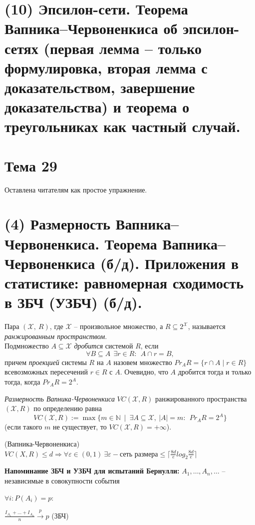 \newpage{}

\section{(10) Эпсилон-сети. Теорема Вапника–Червоненкиса об эпсилон-сетях (первая лемма – только формулировка, вторая лемма с доказательством, завершение доказательства) и теорема о треугольниках как частный случай.}

\newpage{}

\section{Тема 29}
Оставлена читателям как простое упражнение.
\newpage{}

\section{(4) Размерность Вапника–Червоненкиса. Теорема Вапника–Червоненкиса (б/д). Приложения в статистике: равномерная сходимость в ЗБЧ (УЗБЧ) (б/д).}

\Def Пара $(\mathcal{X},\: R)$, где $\mathcal{X}$ -- произвольное множество, а $R \subseteq 2^{\mathcal{X}}$,  называется {\it ранжированным пространством}. \\ 

\Def Подмножество $A \subseteq \mathcal{X}$ {\it дробится} системой $R$, если $$\forall B \subseteq A\:\: \exists r \in R:\:\: A\cap r = B,$$
причем \textit{проекцией} системы $R$ на $A$ назовем множество $Pr_A R = \{ r \cap A \mid r \in R\}$ всевозможных пересечений $r\in R$ с $A$. Очевидно, что $A$ дробится тогда и только тогда, когда $Pr_A R = 2^A$.

\Def \textit{Размерность Вапника-Червоненкиса} $VC(\mathcal{X}, R)$ ранжированного пространства $(\mathcal{X}, R)$ по определению равна$$ VC(\mathcal{X}, R) := \max \{m \in \mathbb{N}\: \mid\: \exists A \subseteq \mathcal{X},\: |A| = m:\:\: Pr_A R = 2^A \}$$
    (если такого $m$ не существует, то $VC(\mathcal{X}, R) = +\infty$).
    
\Th (Вапника-Червоненкиса)
$VC(X, R) \le d \Rightarrow \forall \varepsilon \in (0, 1) \ \exists \varepsilon-\text{сеть размера} \le \lceil\frac{8d}{e}log_2{\frac{8d}{e}}\rceil$

\textbf{Напоминание ЗБЧ и УЗБЧ для испытаний Бернулли:}
$A_1, \ldots, A_n, \ldots$ -- независимые в совокупности события

$\forall i: P(A_i) = p:$

$\frac{I_{A_1} + \ldots + I_{A_n}}{n} \stackrel{p}{\longrightarrow} p$ (ЗБЧ)

